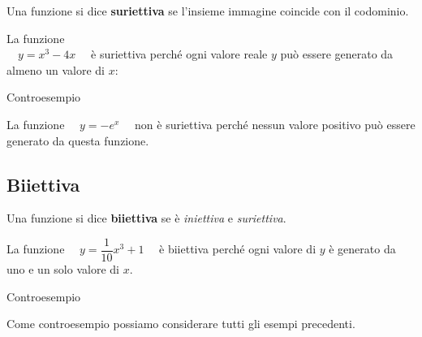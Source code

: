 \begin{definizione}
Una funzione si dice \textbf{suriettiva} se l'insieme immagine coincide con 
il codominio.
\end{definizione}

\begin{minipage}{.45\textwidth}
\begin{esempio}

La funzione\\
\(\quad y= x^3 -4x \quad\) è suriettiva perché ogni valore reale 
\(y\) può essere generato da almeno un valore di \(x\):
\begin{center}
\end{center}
\end{esempio}
\end{minipage}
\hfill
\begin{minipage}{.45\textwidth}
\begin{esempio}Controesempio

La funzione \(\quad y = - e^x \quad\) non è suriettiva perché nessun valore 
positivo può essere generato da questa funzione.
\end{esempio}
\begin{center}
\end{center}
\end{minipage}

\subsection{Biiettiva}

\begin{definizione}
Una funzione si dice \textbf{biiettiva} se è \emph{iniettiva} e 
\emph{suriettiva}.
\end{definizione}

\begin{minipage}{.49\textwidth}
\begin{esempio}

La funzione \(\quad y = \dfrac{1}{10}x^3+1 \quad\) è biiettiva perché ogni 
valore di \(y\) è 
generato da uno e un solo valore di \(x\).
\end{esempio}
\begin{esempio}Controesempio

Come controesempio possiamo considerare tutti gli esempi precedenti.
\end{esempio}
\end{minipage}
\hfill
\begin{minipage}{.49\textwidth}
\begin{center}
\end{center}
\end{minipage}

